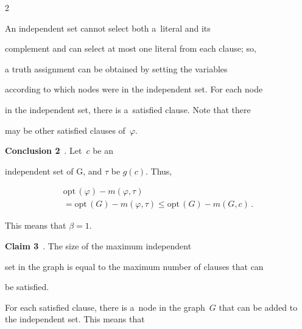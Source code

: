 \begin{multicols}{2}
\smallskip





An independent set cannot select both a~literal and its


complement and can select at most one literal from each clause; so,


a truth assignment can be obtained by setting the variables


according to which nodes were in the independent set. For each node


in the independent set, there is a~satisfied clause. Note that there


may be other satisfied clauses of~$\varphi$.





\smallskip





\noindent


\textbf{Conclusion 2}~\cite{MSAT3Example, P1994}. Let~$c$ be an


independent set of G, and $\tau$ be $g(c)$. Thus,


\begin{multline*}


\mathrm{opt}\,(\varphi) - m(\varphi,\tau)\\


{} =


\mathrm{opt}\,(G) - m(\varphi,\tau) \leq \mathrm{opt}\,(G) - m(G,c)\,.


\end{multline*}


This means that $\beta = 1$.





\columnbreak





\noindent


\textbf{Claim 3}~\cite{MSAT3Example, P1994}. The size of the maximum independent


set in the graph is equal to the maximum number of clauses that can


be satisfied.





\smallskip





For each satisfied clause, there is a~node in the graph~$G$ that can be added to the independent set. This means that



\end{multicols}
